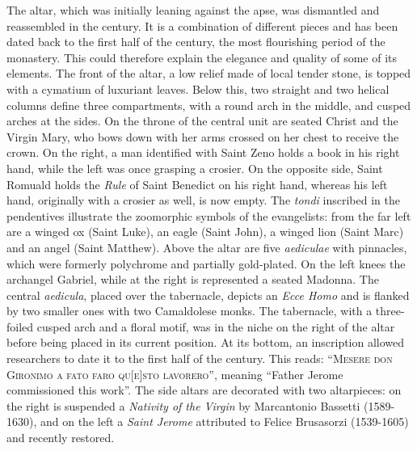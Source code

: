 \documentclass[10pt,b6paper,usenames,twoside]{article}
\begin{document}
\vspace*{-1mm}The altar, which was initially leaning against the apse, was dismantled and reassembled in the  century. It is a combination of different pieces and has been dated back to the first half of the  century, the most flourishing period of the monastery. This could therefore explain the elegance and quality of some of its elements. The front of the altar, a low relief made of local tender stone, is topped with a cymatium of luxuriant leaves. Below this, two straight and two helical columns define three compartments, with a round arch in the middle, and cusped arches at the sides. On the throne of the central unit are seated Christ and the Virgin Mary, who bows down with her arms crossed on her chest to receive the crown. On the right, a man identified with Saint Zeno holds a book in his right hand, while the left was once grasping a crosier. On the opposite side, Saint Romuald holds the \textit{Rule} of Saint Benedict on his right hand, whereas his left hand, originally with a crosier as well, is now empty. The \textit{tondi} inscribed in the pendentives illustrate the zoomorphic symbols of the evangelists: from the far left are a winged ox (Saint Luke), an eagle (Saint John), a winged lion (Saint Marc) and an angel (Saint Matthew). Above the altar are five \textit{aediculae} with pinnacles, which were formerly polychrome and partially gold-plated. On the left knees the archangel Gabriel, while at the right is represented a seated Madonna. The central \textit{aedicula}, placed over the tabernacle, depicts an \textit{Ecce Homo} and is flanked by two smaller ones with two Camaldolese monks. The tabernacle, with a three-foiled cusped arch and a floral motif, was in the niche on the right of the altar before being placed in its current position. At its bottom, an inscription allowed researchers to date it to the first half of the  century. This  reads: “\textsc{Mesere don Gironimo a fato faro qu[e]sto lavorero}”, meaning “Father Jerome commissioned this work”. The side altars are decorated with two altarpieces: on the right is suspended a \textit{Nativity of the Virgin} by Marcantonio Bassetti (1589-1630), and on the left a \textit{Saint Jerome} attributed to Felice Brusasorzi (1539-1605) and recently restored.
\clearpage
\end{document}
